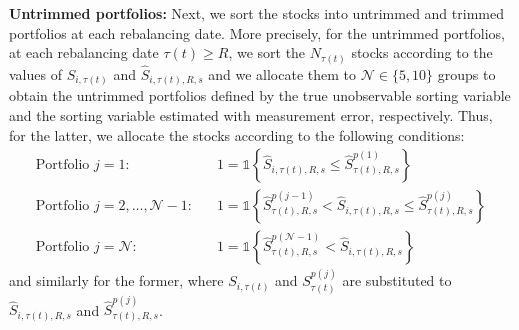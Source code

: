 \textbf{Untrimmed portfolios:} Next, we sort the stocks into untrimmed and trimmed portfolios at each rebalancing date. More precisely, for the untrimmed portfolios, at each rebalancing date $\tau(t) \geq R$, we sort the $N_{\tau(t)}$ stocks according to the values of $S_{i,\tau(t)}$ and $\widehat{S}_{i,\tau(t),R,s}$ and we allocate them to $\mathcal{N} \in \{5, 10\}$ groups to obtain the untrimmed portfolios defined by the true unobservable sorting variable and the sorting variable estimated with measurement error, respectively. Thus, for the latter, we allocate the stocks according to the following conditions:
\begin{align*}
\text{Portfolio $j=1$:} & \quad 1 = \mathds{1} \left\{ \widehat{S}_{i, \tau(t),R,s} \leq \widehat{S}_{\tau(t),R,s}^{p(1)} \right\} \\
\text{Portfolio $j=2,\dots,\mathcal{N}-1$:} & \quad 1 = \mathds{1} \left\{ \widehat{S}_{\tau(t),R,s}^{p(j-1)} < \widehat{S}_{i, \tau(t),R,s} \leq \widehat{S}_{\tau(t),R,s}^{p(j)} \right\} \\
\text{Portfolio $j=\mathcal{N}$:} & \quad 1 = \mathds{1} \left\{ \widehat{S}_{\tau(t),R,s}^{p(\mathcal{N}-1)} < \widehat{S}_{i, \tau(t),R,s} \right\} 
\end{align*}
and similarly for the former, where $S_{i, \tau(t)}$ and $S_{\tau(t)}^{p(j)}$ are substituted to $\widehat{S}_{i, \tau(t),R,s}$ and $\widehat{S}_{\tau(t),R,s}^{p(j)}$. 

